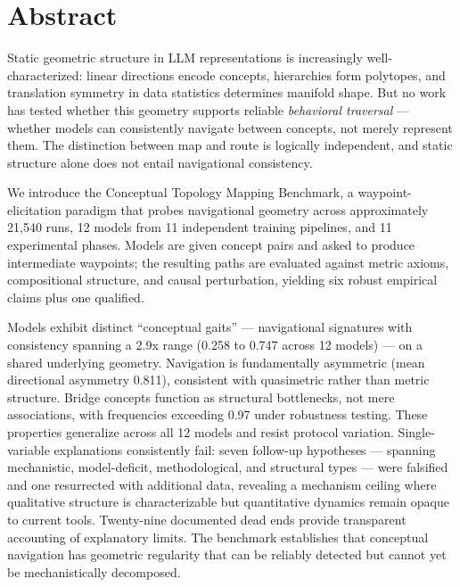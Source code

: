 \section{Abstract}\label{abstract}

Static geometric structure in LLM representations is increasingly well-characterized: linear directions encode concepts, hierarchies form polytopes, and translation symmetry in data statistics determines manifold shape. But no work has tested whether this geometry supports reliable \emph{behavioral traversal} --- whether models can consistently navigate between concepts, not merely represent them. The distinction between map and route is logically independent, and static structure alone does not entail navigational consistency.

We introduce the Conceptual Topology Mapping Benchmark, a waypoint-elicitation paradigm that probes navigational geometry across approximately 21,540 runs, 12 models from 11 independent training pipelines, and 11 experimental phases. Models are given concept pairs and asked to produce intermediate waypoints; the resulting paths are evaluated against metric axioms, compositional structure, and causal perturbation, yielding six robust empirical claims plus one qualified.

Models exhibit distinct ``conceptual gaits'' --- navigational signatures with consistency spanning a 2.9x range (0.258 to 0.747 across 12 models) --- on a shared underlying geometry. Navigation is fundamentally asymmetric (mean directional asymmetry 0.811), consistent with quasimetric rather than metric structure. Bridge concepts function as structural bottlenecks, not mere associations, with frequencies exceeding 0.97 under robustness testing. These properties generalize across all 12 models and resist protocol variation. Single-variable explanations consistently fail: seven follow-up hypotheses --- spanning mechanistic, model-deficit, methodological, and structural types --- were falsified and one resurrected with additional data, revealing a mechanism ceiling where qualitative structure is characterizable but quantitative dynamics remain opaque to current tools. Twenty-nine documented dead ends provide transparent accounting of explanatory limits. The benchmark establishes that conceptual navigation has geometric regularity that can be reliably detected but cannot yet be mechanistically decomposed.
